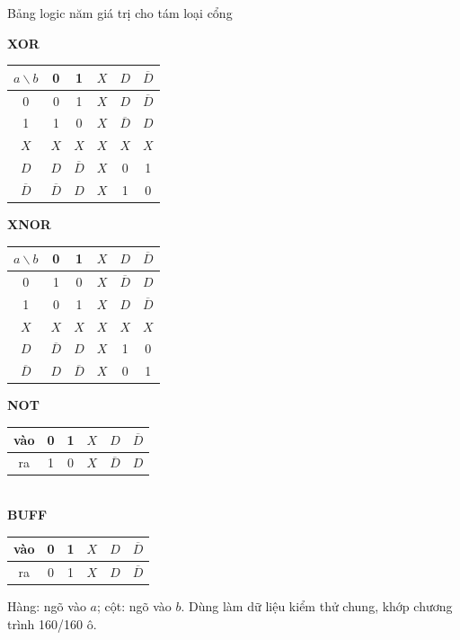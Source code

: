 \begin{frame}{Bảng logic năm giá trị cho tám loại cổng}
\vspace{3mm}
\begin{minipage}[t]{0.24\textwidth}\centering
\textbf{XOR}\\[1pt]
\begin{tabular}{@{}c|ccccc@{}}
$a\backslash b$ & 0 & 1 & $X$ & $D$ & $\overline{D}$\\\hline
0 & 0 & 1 & $X$ & $D$ & $\overline{D}$\\
1 & 1 & 0 & $X$ & $\overline{D}$ & $D$\\
$X$ & $X$ & $X$ & $X$ & $X$ & $X$\\
$D$ & $D$ & $\overline{D}$ & $X$ & 0 & 1\\
$\overline{D}$ & $\overline{D}$ & $D$ & $X$ & 1 & 0\\
\end{tabular}
\end{minipage}\hfill
\begin{minipage}[t]{0.24\textwidth}\centering
\textbf{XNOR}\\[1pt]
\begin{tabular}{@{}c|ccccc@{}}
$a\backslash b$ & 0 & 1 & $X$ & $D$ & $\overline{D}$\\\hline
0 & 1 & 0 & $X$ & $\overline{D}$ & $D$\\
1 & 0 & 1 & $X$ & $D$ & $\overline{D}$\\
$X$ & $X$ & $X$ & $X$ & $X$ & $X$\\
$D$ & $\overline{D}$ & $D$ & $X$ & 1 & 0\\
$\overline{D}$ & $D$ & $\overline{D}$ & $X$ & 0 & 1\\
\end{tabular}
\end{minipage}\hfill
\begin{minipage}[t]{0.46\textwidth}\centering
\textbf{NOT}\\[1pt]
\begin{tabular}{@{}c|ccccc@{}}
vào & 0 & 1 & $X$ & $D$ & $\overline{D}$\\\hline
ra & 1 & 0 & $X$ & $\overline{D}$ & $D$\\
\end{tabular}
\\[4mm]
\textbf{BUFF}\\[1pt]
\begin{tabular}{@{}c|ccccc@{}}
vào & 0 & 1 & $X$ & $D$ & $\overline{D}$\\\hline
ra & 0 & 1 & $X$ & $D$ & $\overline{D}$\\
\end{tabular}
\end{minipage}

\vspace{2mm}
{\footnotesize Hàng: ngõ vào $a$; cột: ngõ vào $b$. Dùng làm dữ liệu kiểm thử chung, khớp chương trình 160/160 ô.}
\end{frame}

